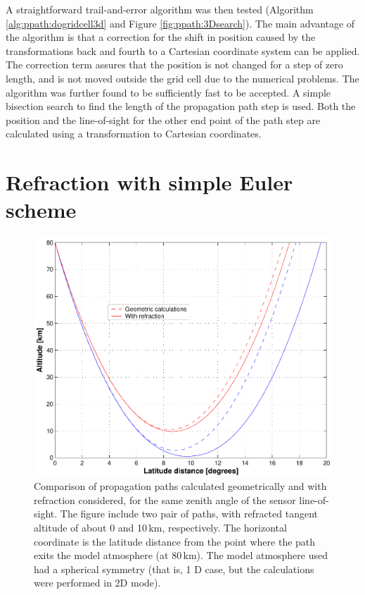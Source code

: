 A straightforward trail-and-error algorithm was then tested
(Algorithm \ref{alg:ppath:dogridcell3d} and
Figure \ref{fig:ppath:3Dsearch}). The main advantage of the algorithm
is that a correction for the shift in position caused by the
transformations back and fourth to a Cartesian coordinate system can
be applied. The correction term assures that the position is not
changed for a step of zero length, and is not moved outside the grid
cell due to the numerical problems. The algorithm was further found to
be sufficiently fast to be accepted. A simple bisection search to find
the length of the propagation path step is used. Both the position and
the line-of-sight for the other end point of the path step are
calculated using a transformation to Cartesian coordinates.  




\section{Refraction with simple Euler scheme}
\label{sec:ppath:refreuler}

\begin{figure}
 \begin{center}
  \includegraphics*[width=0.80\hsize]{ppath_refr1}
  \caption{Comparison of propagation paths calculated geometrically and 
    with refraction considered, for the same zenith angle of the
    sensor line-of-sight. The figure include two pair of paths, with
    refracted tangent altitude of about 0 and 10\,km, respectively.
    The horizontal coordinate is the latitude distance from the point
    where the path exits the model atmosphere (at 80\,km). The model
    atmosphere used had a spherical symmetry (that is, 1 D case, but
    the calculations were performed in 2D mode).}
  \label{fig:ppath:ppath_refr1}  
 \end{center}
\end{figure}

